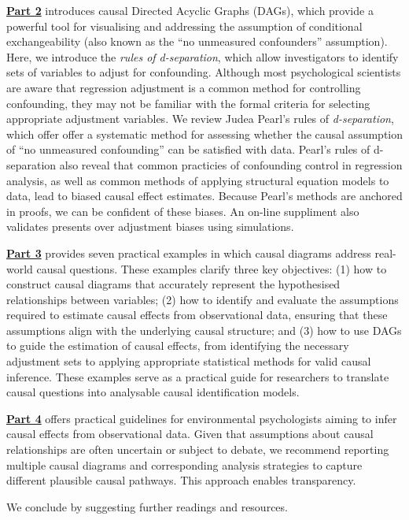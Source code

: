 \documentclass[
  singlecolumn]{article}
\begin{document}
\hyperref[section-part2]{\textbf{Part 2}} introduces causal Directed
Acyclic Graphs (DAGs), which provide a powerful tool for visualising and
addressing the assumption of conditional exchangeability (also known as
the ``no unmeasured confounders'' assumption). Here, we introduce the
\emph{rules of d-separation}, which allow investigators to identify sets
of variables to adjust for confounding. Although most psychological
scientists are aware that regression adjustment is a common method for
controlling confounding, they may not be familiar with the formal
criteria for selecting appropriate adjustment variables. We review Judea
Pearl's rules of \emph{d-separation}, which offer offer a systematic
method for assessing whether the causal assumption of ``no unmeasured
confounding'' can be satisfied with data. Pearl's rules of d-separation
also reveal that common practicies of confounding control in regression
analysis, as well as common methods of applying structural equation
models to data, lead to biased causal effect estimates. Because Pearl's
methods are anchored in proofs, we can be confident of these biases. An
on-line suppliment also validates presents over adjustment biases using
simulations.

\hyperref[section-part3]{\textbf{Part 3}} provides seven practical
examples in which causal diagrams address real-world causal questions.
These examples clarify three key objectives: (1) how to construct causal
diagrams that accurately represent the hypothesised relationships
between variables; (2) how to identify and evaluate the assumptions
required to estimate causal effects from observational data, ensuring
that these assumptions align with the underlying causal structure; and
(3) how to use DAGs to guide the estimation of causal effects, from
identifying the necessary adjustment sets to applying appropriate
statistical methods for valid causal inference. These examples serve as
a practical guide for researchers to translate causal questions into
analysable causal identification models.

\hyperref[section-part4]{\textbf{Part 4}} offers practical guidelines
for environmental psychologists aiming to infer causal effects from
observational data. Given that assumptions about causal relationships
are often uncertain or subject to debate, we recommend reporting
multiple causal diagrams and corresponding analysis strategies to
capture different plausible causal pathways. This approach enables
transparency.

We conclude by suggesting further readings and resources.
\end{document}

